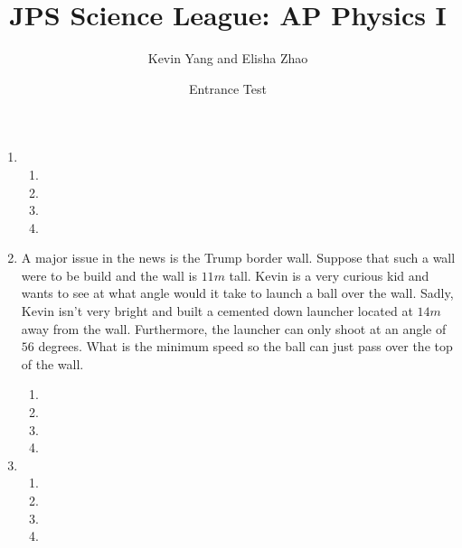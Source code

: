 \documentclass{article}
\title{JPS Science League: AP Physics I}
\author{Kevin Yang and Elisha Zhao}
\date{Entrance Test}
\begin{document}
	\maketitle
	\renewcommand{\labelenumii}{\alph{enumii})}
	\begin{enumerate}
		\item  
		\begin{enumerate}
			\item
			\item 
			\item 
			\item
		\end{enumerate}
		\item  A major issue in the news is the Trump border wall. Suppose that such a wall were to be build and the wall is $11m$ tall. Kevin is a very curious kid and wants to see at what angle would it take to launch a ball over the wall. Sadly, Kevin isn't very bright and built a cemented down launcher located at $14m$ away from the wall. Furthermore, the launcher can only shoot at an angle of $56$ degrees. What is the minimum speed so the ball can just pass over the top of the wall.
		\begin{enumerate}
			\item
			\item 
			\item 
			\item
		\end{enumerate}
		\item  
		\begin{enumerate}
			\item
			\item 
			\item 
			\item
		\end{enumerate}
	\end{enumerate}
\end{document}
